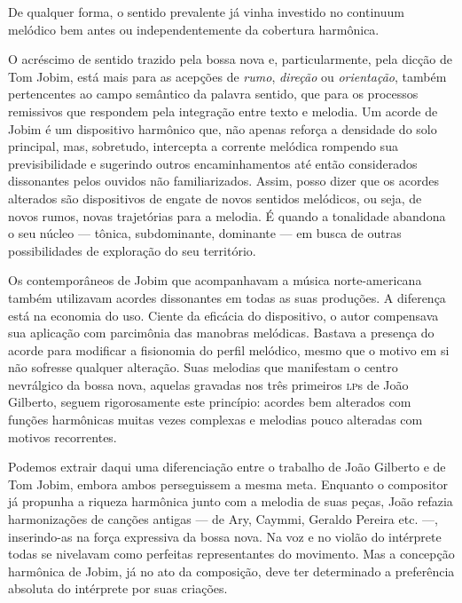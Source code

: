 De qualquer forma, o sentido prevalente já vinha investido no continuum
melódico bem antes ou independentemente da cobertura harmônica.

O acréscimo de sentido trazido pela bossa nova e, particularmente, pela
dicção de Tom Jobim, está mais para as acepções de \textit{rumo}, \textit{direção} ou
\textit{orientação}, também pertencentes ao campo semântico da palavra sentido,
que para os processos remissivos que respondem pela integração entre
texto e melodia. Um acorde de Jobim é um dispositivo harmônico que, não
apenas reforça a densidade do solo principal, mas, sobretudo, intercepta
a corrente melódica rompendo sua previsibilidade e sugerindo outros
encaminhamentos até então considerados dissonantes pelos ouvidos não
familiarizados. Assim, posso dizer que os acordes alterados são
dispositivos de engate de novos sentidos melódicos, ou seja, de novos
rumos, novas trajetórias para a melodia. É quando a tonalidade abandona
o seu núcleo --- tônica, subdominante, dominante --- em busca de outras
possibilidades de exploração do seu território.

Os contemporâneos de Jobim que acompanhavam a música norte-americana
também utilizavam acordes dissonantes em todas as suas produções. A
diferença está na economia do uso. Ciente da eficácia do dispositivo, o
autor compensava sua aplicação com parcimônia das manobras melódicas.
Bastava a presença do acorde para modificar a fisionomia do perfil
melódico, mesmo que o motivo em si não sofresse qualquer alteração. Suas
melodias que manifestam o centro nevrálgico da bossa nova, aquelas
gravadas nos três primeiros \textsc{lp}s de João Gilberto, seguem rigorosamente
este princípio: acordes bem alterados com funções harmônicas muitas
vezes complexas e melodias pouco alteradas com motivos recorrentes.

Podemos extrair daqui uma diferenciação entre o trabalho de João
Gilberto e de Tom Jobim, embora ambos perseguissem a mesma meta.
Enquanto o compositor já propunha a riqueza harmônica junto com a
melodia de suas peças, João refazia harmonizações de canções antigas --- de Ary, Caymmi, Geraldo Pereira etc. ---, inserindo-as na força expressiva
da bossa nova. Na voz e no violão do intérprete todas se nivelavam como
perfeitas representantes do movimento. Mas a concepção harmônica de
Jobim, já no ato da composição, deve ter determinado a preferência
absoluta do intérprete por suas criações.

